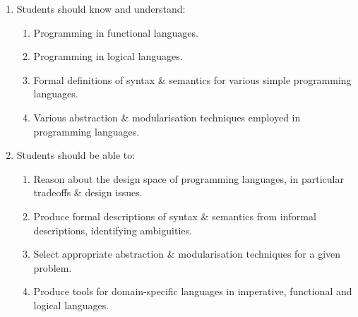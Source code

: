 \documentclass[11pt]{article}
\begin{document}
\begin{enumerate}
\item Students should know and understand:
\begin{enumerate}
\item Programming in functional languages.
\item Programming in logical languages.
\item Formal definitions of syntax \& semantics for various
simple programming languages.
\item Various abstraction \& modularisation techniques
employed in programming languages.
\end{enumerate}
\item Students should be able to:
\begin{enumerate}
\item Reason about the design space of programming languages,
in particular tradeoffs \& design issues.
\item Produce formal descriptions of syntax \& semantics
from informal descriptions, identifying ambiguities.
\item Select appropriate abstraction \& modularisation techniques
for a given problem.
\item Produce tools for domain-specific languages
in imperative, functional and logical languages.
\end{enumerate}
\end{enumerate}
\end{document}
